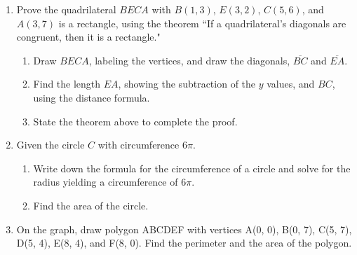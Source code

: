 \documentclass[12pt, oneside]{article}
\begin{document}
\begin{enumerate}
  \item Prove the quadrilateral $BECA$ with $B(1, 3)$, $E(3, 2)$, $C(5,6)$, and $A(3, 7)$ is a rectangle, using the theorem ``If a quadrilateral's diagonals are congruent, then it is a rectangle."
  \begin{enumerate}
    \item Draw $BECA$, labeling the vertices, and draw the diagonals, $\overline{BC}$ and $\overline{EA}$.
    \item Find the length $EA$, showing the subtraction of the $y$ values, and $BC$, using the distance formula.
    \item State the theorem above to complete the proof.
  \end{enumerate}
  \vspace{2cm}

  \item Given the circle $C$ with circumference $6\pi$.
  \begin{enumerate}
    \item Write down the formula for the circumference of a circle and solve for the radius yielding a circumference of $6\pi$. \vspace{1cm}
    \item Find the area of the circle.
  \end{enumerate}

\newpage
  \item On the graph, draw polygon ABCDEF with vertices A(0, 0), B(0, 7), C(5, 7), D(5, 4), E(8, 4), and F(8, 0). Find the perimeter and the area of the polygon.\\[1cm]
  \vspace{2cm}


\end{enumerate}
\end{document}
